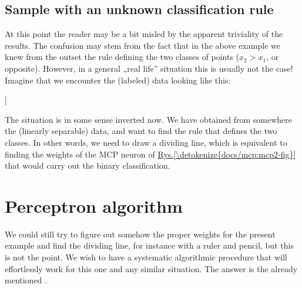 \documentclass[a4paper,12pt,polish]{jupyterBook}
\begin{document}
\subsection{Sample with an unknown classification rule}
\label{\detokenize{docs/perceptron:sample-with-an-unknown-classification-rule}}
\sphinxAtStartPar
At this point the reader may be a bit misled by the apparent triviality of the results. The confusion may stem from the fact that in the above example we knew from the outset the rule defining the two classes of points (\(x_2>x_1\), or opposite). However, in a general „real life” situation this is usually not the case! Imagine that we encounter the (labeled) data  looking like this:
\begin{sphinxVerbatimInput}

\begin{sphinxVerbatim}[commandchars=\\\{\}]
\PYG{p}{[}\PYG{p}{]}
\end{sphinxVerbatim}
\end{sphinxVerbatimInput}
\begin{sphinxVerbatimOutput}

\begin{sphinxVerbatim}[commandchars=\\\{\}]
[[0.39498232 0.30505482 0.        ]
 [0.11269714 0.95880028 1.        ]
 [0.29661374 0.11679508 0.        ]
 [0.89268244 0.35261853 0.        ]
 [0.89178862 0.25506102 0.        ]]
\end{sphinxVerbatim}
\end{sphinxVerbatimOutput}
\begin{sphinxVerbatimOutput}

\noindent{}
\end{sphinxVerbatimOutput}

\sphinxAtStartPar
The situation is in some sense inverted now. We have obtained from somewhere the (linearly separable) data, and want to find the rule that defines the two classes. In other words, we need to draw a dividing line, which is equivalent to finding the weights of the MCP neuron of \hyperref[\detokenize{docs/mcp:mcp2-fig}]{Rys.\@ \ref{\detokenize{docs/mcp:mcp2-fig}}} that would carry out the binary classification.


\section{Perceptron algorithm}
\label{\detokenize{docs/perceptron:perceptron-algorithm}}\label{\detokenize{docs/perceptron:lab-pa}}
\sphinxAtStartPar
We could still try to figure out somehow the proper weights for the present example and find the dividing line, for instance with a ruler and pencil, but this is not the point. We wish to have a systematic algorithmic procedure that will effortlessly work for this one and any similar situation. The answer is the already mentioned .
\end{document}
